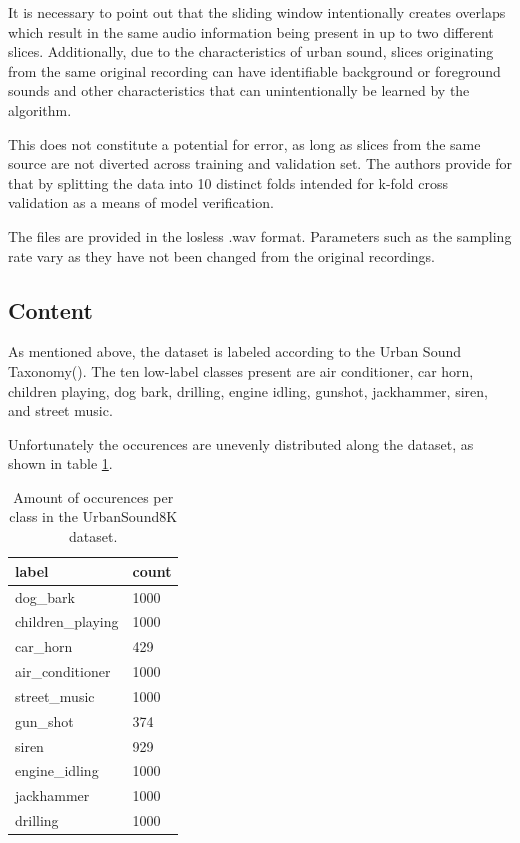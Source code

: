 It is necessary to point out that the sliding window intentionally creates overlaps which result in the same audio information being present in up to two different slices. Additionally, due to the characteristics of urban sound, slices originating from the same original recording can have identifiable background or foreground sounds and other characteristics that can unintentionally be learned by the algorithm. %

 This does not constitute a potential for error, as long as 
  slices from the same source are not diverted across training and validation set. The authors provide for that by splitting the data into 10 distinct folds intended for k-fold cross validation as a means of model verification.
  
  The files are provided in the losless .wav format. Parameters such as the sampling rate vary as they have not been changed from the original recordings.



\subsection{Content}

As mentioned above, the dataset is labeled according to the Urban Sound Taxonomy(\cite{Salamon:UrbanSound:ACMMM:14}). The ten low-label classes present are air conditioner, car horn, children playing, dog bark, drilling, engine idling, gunshot, jackhammer, siren, and street music.

Unfortunately the occurences are unevenly distributed along the dataset, as shown in table \ref{tbl:urbansound8kdistribution}. 

\begin{table}[h]
\centering
\begin{tabular}{ll}
\hline
label & count \\
\hline
dog_bark & 1000 \\
children_playing & 1000 \\
car_horn & 429 \\
air_conditioner & 1000 \\
street_music & 1000 \\
gun_shot & 374 \\
siren & 929 \\
engine_idling & 1000 \\
jackhammer & 1000 \\
drilling & 1000
\end{tabular}
\caption{Amount of occurences per class in the UrbanSound8K dataset.}
\label{tbl:urbansound8kdistribution}
\par
\end{table}

